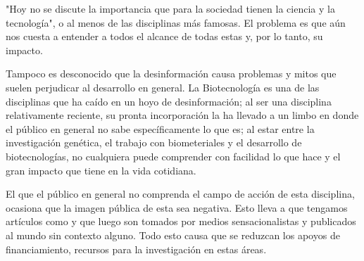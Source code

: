\documentclass[12pt]{article}
\begin{document}
	\par "Hoy no se discute la importancia que para la sociedad tienen la ciencia y la tecnología"\cite{CC}, o al menos de las disciplinas más famosas. El problema es que aún nos cuesta a entender a todos el alcance de todas estas y, por lo tanto, su impacto.	
	\par Tampoco es desconocido que la desinformación causa problemas y mitos que suelen perjudicar al desarrollo en general. La Biotecnología es una de las disciplinas que ha caído en un hoyo de desinformación; al ser una disciplina relativamente reciente, su pronta incorporación la ha llevado a un limbo en donde el público en general no sabe específicamente lo que es; al estar entre la investigación genética, el trabajo con biometeriales y el desarrollo de biotecnologías, no cualquiera puede comprender con facilidad lo que hace y el gran impacto que tiene en la vida cotidiana.
	\par El que el público en general no comprenda el campo de acción de esta disciplina, ocasiona que la imagen pública de esta sea negativa. Esto lleva a que tengamos artículos como \cite{filos} y \cite{mTransgenicos} que luego son tomados por medios sensacionalistas y publicados al mundo sin contexto alguno. Todo esto causa que se reduzcan los apoyos de financiamiento, recursos para la investigación en estas áreas.
\end{document}
